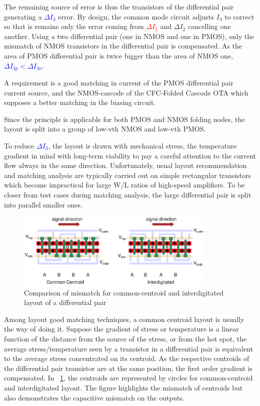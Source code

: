 The remaining source of error is thus the transistors of the differential pair generating a \textcolor{blue}{\(\Delta I_3\)} error. By design, the common mode circuit adjusts \(I_3\) to correct so that is remains only the error coming from \textcolor{red}{\(\Delta I_1\)} and \textcolor{Xgreen}{\(\Delta I_2\)} cancelling one another. Using a two differential pair (one in NMOS and one in PMOS), only the mismatch of NMOS transistors in the differential pair is compensated. As the area of PMOS differential pair is twice bigger than the area of NMOS one, \textcolor{blue}{\(\Delta I_{3p} < \Delta I_{3n}\)}.

A requirement is a good matching in current of the PMOS differential pair current source, and the NMOS-cascode of the CFC-Folded Cascode OTA which supposes a better matching in the biasing circuit.

Since the principle is applicable for both PMOS and NMOS folding nodes, the layout is split into a group of low-vth NMOS and low-vth PMOS.

To reduce \textcolor{blue}{\(\Delta I_3\)}, the layout is drawn with mechanical stress, the temperature gradient in mind with long-term viability to pay a careful attention to the current flow always in the same direction. Unfortunately, usual layout recommendation and matching analysis are typically carried out on simple rectangular transistors which become impractical for large W/L ratios of high-speed amplifiers. To be closer from test cases during matching analysis, the large differential pair is split into parallel smaller ones.

\begin{figure}[htp]
    \centering
    \includegraphics[width=0.85\textwidth]{Chapter7/Figs/common-centroi-vs-interdigitated.ps}
    \caption{Comparison of mismatch for common-centroid and interdigitated layout of a differential pair}
    \label{fig:common-centroid-vs-interdigitated}
\end{figure}

Among layout good matching techniques, a common centroid layout is usually the way of doing it. Suppose the gradient of stress or temperature is a linear function of the distance from the source of the stress, or from the hot spot, the average stress/temperature seen by a transistor in a differential pair is equivalent to the average stress concentrated on its centroid. As the respective centroids of the differential pair transistor are at the same position, the first order gradient is compensated. In \figurename~\ref{fig:common-centroid-vs-interdigitated}, the centroids are represented by circles for common-centroid and interdigitated layout.
The figure highlights the mismatch of centroids but also demonstrates the capacitive mismatch on the outputs.


